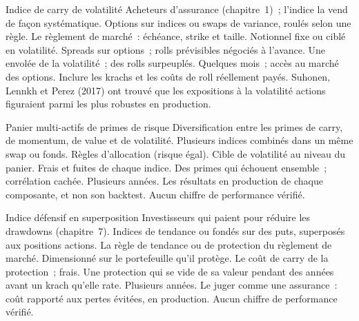 \begin{strategyfile}{Indice de carry de volatilité}\label{strat:s2:quantitative-investment-strategies:volcarry}
 Acheteurs d'assurance (chapitre~1)~; l'indice la vend de façon systématique.
 Options sur indices ou swaps de variance, roulés selon une règle.
 Le règlement de marché~: échéance, strike et taille.
 Notionnel fixe ou ciblé en volatilité.
 Spreads sur options~; rolls prévisibles négociés à l'avance.
 Une envolée de la volatilité~; des rolls surpeuplés.
 Quelques mois~; accès au marché des options.
 Inclure les krachs et les coûts de roll réellement payés.
 Suhonen, Lennkh et Perez (2017) ont trouvé que les expositions à la volatilité actions figuraient parmi les plus robustes en production.
\end{strategyfile}

\begin{strategyfile}{Panier multi-actifs de primes de risque}\label{strat:s2:quantitative-investment-strategies:basket}
 Diversification entre les primes de carry, de momentum, de value et de volatilité.
 Plusieurs indices combinés dans un même swap ou fonds.
 Règles d'allocation (risque égal).
 Cible de volatilité au niveau du panier.
 Frais et fuites de chaque indice.
 Des primes qui échouent ensemble~; corrélation cachée.
 Plusieurs années.
 Les résultats en production de chaque composante, et non son backtest.
 Aucun chiffre de performance vérifié.
\end{strategyfile}

\begin{strategyfile}{Indice défensif en superposition}\label{strat:s2:quantitative-investment-strategies:defensive}
 Investisseurs qui paient pour réduire les drawdowns (chapitre~7).
 Indices de tendance ou fondés sur des puts, superposés aux positions actions.
 La règle de tendance ou de protection du règlement de marché.
 Dimensionné sur le portefeuille qu'il protège.
 Le coût de carry de la protection~; frais.
 Une protection qui se vide de sa valeur pendant des années avant un krach qu'elle rate.
 Plusieurs années.
 Le juger comme une assurance~: coût rapporté aux pertes évitées, en production.
 Aucun chiffre de performance vérifié.
\end{strategyfile}

